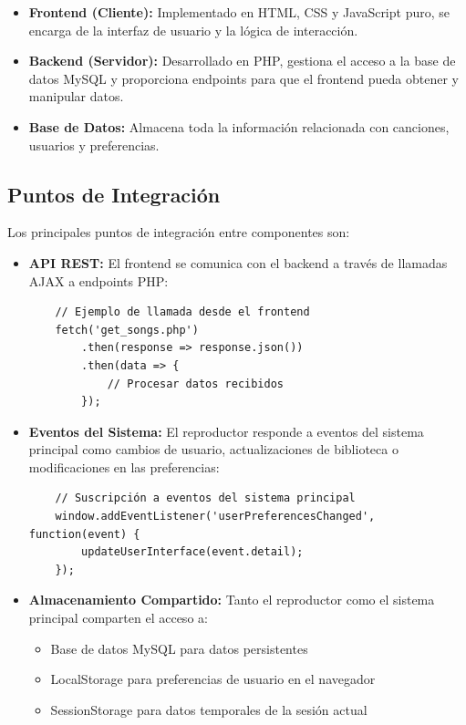 \documentclass[a4paper,12pt]{article}
\begin{document}
\begin{itemize}
    \item \textbf{Frontend (Cliente):} Implementado en HTML, CSS y JavaScript puro, se encarga de la interfaz de usuario y la lógica de interacción.
    
    \item \textbf{Backend (Servidor):} Desarrollado en PHP, gestiona el acceso a la base de datos MySQL y proporciona endpoints para que el frontend pueda obtener y manipular datos.
    
    \item \textbf{Base de Datos:} Almacena toda la información relacionada con canciones, usuarios y preferencias.
\end{itemize}

\subsection{Puntos de Integración}
Los principales puntos de integración entre componentes son:

\begin{itemize}
    \item \textbf{API REST:} El frontend se comunica con el backend a través de llamadas AJAX a endpoints PHP:
    \begin{verbatim}
    // Ejemplo de llamada desde el frontend
    fetch('get_songs.php')
        .then(response => response.json())
        .then(data => {
            // Procesar datos recibidos
        });
    \end{verbatim}
    
    \item \textbf{Eventos del Sistema:} El reproductor responde a eventos del sistema principal como cambios de usuario, actualizaciones de biblioteca o modificaciones en las preferencias:
    \begin{verbatim}
    // Suscripción a eventos del sistema principal
    window.addEventListener('userPreferencesChanged', function(event) {
        updateUserInterface(event.detail);
    });
    \end{verbatim}
    
    \item \textbf{Almacenamiento Compartido:} Tanto el reproductor como el sistema principal comparten el acceso a:
    \begin{itemize}
        \item Base de datos MySQL para datos persistentes
        \item LocalStorage para preferencias de usuario en el navegador
        \item SessionStorage para datos temporales de la sesión actual
    \end{itemize}
\end{itemize}
\end{document}
